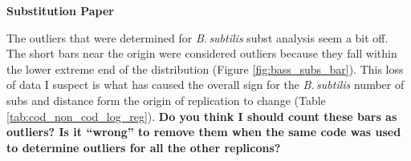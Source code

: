\documentclass[12pt]{article}
\newcommand{\smel}{\textit{S.\,meliloti}\xspace}
\newcommand{\p}{progressiveMauve\xspace}
\newcommand{\strep}{\textit{Streptomyces}\xspace}
\newcommand{\bass}{\textit{B.\,subtilis}\xspace}
\newcommand{\ecol}{\textit{E.\,coli}\xspace}
\newcommand{\ecoli}{\textit{Escherichia coli}\xspace}
\newcommand{\pa}{pSymA\xspace}
\newcommand{\dn}{\textit{dN}\xspace}
\begin{document}

\textbf{Substitution Paper}

The outliers that were determined for \bass subst analysis seem a bit off.
The short bars near the origin were considered outliers because they fall within the lower extreme end of the distribution (Figure \ref{fig:bass_subs_bar}).
This loss of data I suspect is what has caused the overall sign for the \bass number of subs and distance form the origin of replication to change (Table \ref{tab:cod_non_cod_log_reg}).
\textbf{Do you think I should count these bars as outliers? Is it ``wrong'' to remove them when the same code was used to determine outliers for all the other replicons?}
\end{document}

